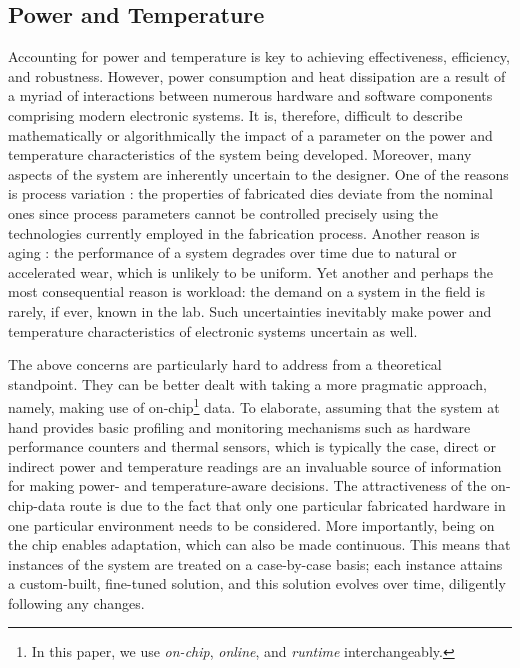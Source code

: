 \subsection{Power and Temperature}
Accounting for power and temperature is key to achieving effectiveness,
efficiency, and robustness. However, power consumption and heat dissipation are
a result of a myriad of interactions between numerous hardware and software
components comprising modern electronic systems. It is, therefore, difficult to
describe mathematically or algorithmically the impact of a parameter on the
power and temperature characteristics of the system being developed. Moreover,
many aspects of the system are inherently uncertain to the designer. One of the
reasons is process variation \cite{chandrakasan2000}: the properties of
fabricated dies deviate from the nominal ones since process parameters cannot be
controlled precisely using the technologies currently employed in the
fabrication process. Another reason is aging \cite{coskun2006}: the performance
of a system degrades over time due to natural or accelerated wear, which is
unlikely to be uniform. Yet another and perhaps the most consequential reason is
workload: the demand on a system in the field is rarely, if ever, known in the
lab. Such uncertainties inevitably make power and temperature characteristics of
electronic systems uncertain as well.

The above concerns are particularly hard to address from a theoretical
standpoint. They can be better dealt with taking a more pragmatic approach,
namely, making use of on-chip\footnote{In this paper, we use \emph{on-chip},
\emph{online}, and \emph{runtime} interchangeably.} data. To elaborate, assuming
that the system at hand provides basic profiling and monitoring mechanisms such
as hardware performance counters and thermal sensors, which is typically the
case, direct or indirect power and temperature readings are an invaluable source
of information for making power- and temperature-aware decisions. The
attractiveness of the on-chip-data route is due to the fact that only one
particular fabricated hardware in one particular environment needs to be
considered. More importantly, being on the chip enables adaptation, which can
also be made continuous. This means that instances of the system are treated on
a case-by-case basis; each instance attains a custom-built, fine-tuned solution,
and this solution evolves over time, diligently following any changes.

